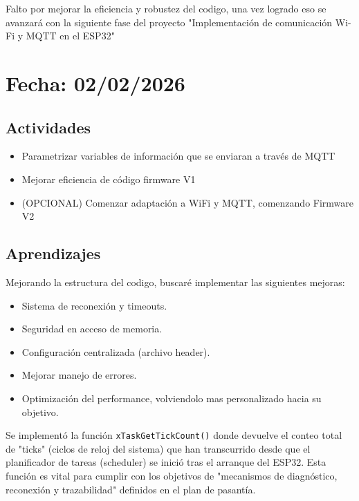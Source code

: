 \documentclass[12pt, a4paper]{article}
\begin{document}
    Falto por mejorar la eficiencia y robustez del codigo, una vez logrado eso se avanzará con la siguiente fase del proyecto "Implementación de comunicación Wi-Fi y MQTT en el ESP32"

    \section*{Fecha: 02/02/2026}

    \subsection*{Actividades}

    \begin{itemize}
        \item Parametrizar variables de información que se enviaran a través de MQTT
        \item Mejorar eficiencia de código firmware V1
        \item (OPCIONAL) Comenzar adaptación a WiFi y MQTT, comenzando Firmware V2
    \end{itemize}

    \subsection*{Aprendizajes}

    Mejorando la estructura del codigo, buscaré implementar las siguientes mejoras:

    \begin{itemize}
        \item Sistema de reconexión y timeouts.
        \item Seguridad en acceso de memoria.
        \item Configuración centralizada (archivo header).
        \item Mejorar manejo de errores.
        \item Optimización del performance, volviendolo mas personalizado hacia su objetivo.
    \end{itemize}

    Se implementó la función \texttt{xTaskGetTickCount()} donde devuelve el conteo total de "ticks" (ciclos de reloj del sistema) que han transcurrido desde que el planificador de tareas (scheduler) se inició tras el arranque del ESP32. Esta función es vital para cumplir con los objetivos de "mecanismos de diagnóstico, reconexión y trazabilidad" definidos en el plan de pasantía.    
\end{document}
